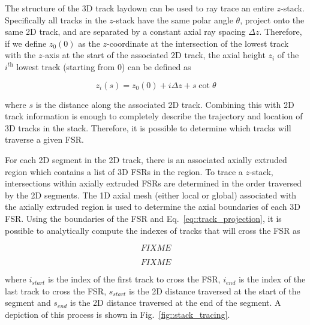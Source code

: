 The structure of the 3D track laydown can be used to ray trace an entire $z$-stack. Specifically all tracks in the $z$-stack have the same polar angle $\theta$, project onto the same 2D track, and are separated by a constant axial ray spacing $\Delta z$. Therefore, if we define $z_0(0)$ as the $z$-coordinate at the intersection of the lowest track with the $z$-axis at the start of the associated 2D track, the axial height $z_i$ of the $i^{\textit{th}}$ lowest track (starting from 0) can be defined as

\begin{equation}
z_i(s) = z_0(0) + i\Delta z + s \cot{\theta}
\label{eq::track_projection}
\end{equation}

where $s$ is the distance along the associated 2D track. Combining this with 2D track information is enough to completely describe the trajectory and location of 3D tracks in the stack. Therefore, it is possible to determine which tracks will traverse a given FSR.

For each 2D segment in the 2D track, there is an associated axially extruded region which contains a list of 3D FSRs in the region. To trace a $z$-stack, intersections within axially extruded FSRs are determined in the order traversed by the 2D segments. The 1D axial mesh (either local or global) associated with the axially extruded region is used to determine the axial boundaries of each 3D FSR. Using the boundaries of the FSR and Eq.~\ref{eq::track_projection}, it is possible to analytically compute the indexes of tracks that will cross the FSR as

\begin{equation}
FIXME
\label{eq::start_track}
\end{equation}

\begin{equation}
FIXME
\label{eq::end_track}
\end{equation}


where $i_{\textit{start}}$ is the index of the first track to cross the FSR, $i_{\textit{end}}$ is the index of the last track to cross the FSR, $s_{\textit{start}}$ is the 2D distance traversed at the start of the segment and $s_{\textit{end}}$ is the 2D distance traversed at the end of the segment. A depiction of this process is shown in Fig.~\ref{fig::stack_tracing}.


